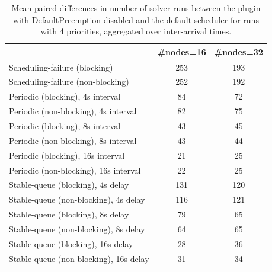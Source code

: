 \begin{table}[t]
\tiny
\setlength{\tabcolsep}{1.2pt}
\renewcommand{\arraystretch}{1.12}
\centering
\caption{Mean paired differences in number of solver runs between the plugin with DefaultPreemption disabled and the default scheduler for runs with 4 priorities, aggregated over inter-arrival times.}
\label{tab:solver_runs-defpreempt0-prio4-std0-agg-arrival}
\begin{tabular}{l c c}
\toprule
 & \#nodes=16 & \#nodes=32 \\
\midrule
Scheduling-failure (blocking) & 253 & 193 \\
Scheduling-failure (non-blocking) & 252 & 192 \\
Periodic (blocking), 4s interval & 84 & 72 \\
Periodic (non-blocking), 4s interval & 82 & 75 \\
Periodic (blocking), 8s interval & 43 & 45 \\
Periodic (non-blocking), 8s interval & 43 & 44 \\
Periodic (blocking), 16s interval & 21 & 25 \\
Periodic (non-blocking), 16s interval & 22 & 25 \\
Stable-queue (blocking), 4s delay & 131 & 120 \\
Stable-queue (non-blocking), 4s delay & 116 & 121 \\
Stable-queue (blocking), 8s delay & 79 & 65 \\
Stable-queue (non-blocking), 8s delay & 64 & 65 \\
Stable-queue (blocking), 16s delay & 28 & 36 \\
Stable-queue (non-blocking), 16s delay & 31 & 34 \\
\bottomrule
\end{tabular}
\end{table}
